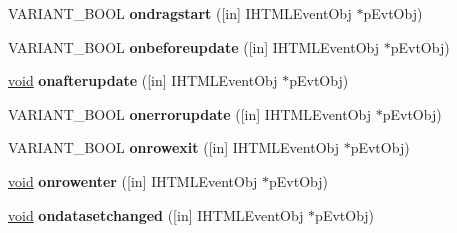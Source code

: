 \begin{DoxyCompactItemize}
V\+A\+R\+I\+A\+N\+T\+\_\+\+B\+O\+OL {\bfseries ondragstart} (\mbox{[}in\mbox{]} I\+H\+T\+M\+L\+Event\+Obj $\ast$p\+Evt\+Obj)
\item 
\mbox{\label{interface_m_s_h_t_m_l_1_1_h_t_m_l_form_element_events2_af6237e852617b7defe6d3bcddcc452fc}} 
V\+A\+R\+I\+A\+N\+T\+\_\+\+B\+O\+OL {\bfseries onbeforeupdate} (\mbox{[}in\mbox{]} I\+H\+T\+M\+L\+Event\+Obj $\ast$p\+Evt\+Obj)
\item 
\mbox{\label{interface_m_s_h_t_m_l_1_1_h_t_m_l_form_element_events2_a7a2217df95fcab8315219ac0586d25a4}} 
\hyperlink{interfacevoid}{void} {\bfseries onafterupdate} (\mbox{[}in\mbox{]} I\+H\+T\+M\+L\+Event\+Obj $\ast$p\+Evt\+Obj)
\item 
\mbox{\label{interface_m_s_h_t_m_l_1_1_h_t_m_l_form_element_events2_a716094f204afb6b6a631b0731f5d0967}} 
V\+A\+R\+I\+A\+N\+T\+\_\+\+B\+O\+OL {\bfseries onerrorupdate} (\mbox{[}in\mbox{]} I\+H\+T\+M\+L\+Event\+Obj $\ast$p\+Evt\+Obj)
\item 
\mbox{\label{interface_m_s_h_t_m_l_1_1_h_t_m_l_form_element_events2_aaf719770ec1838567d63c6818a734cef}} 
V\+A\+R\+I\+A\+N\+T\+\_\+\+B\+O\+OL {\bfseries onrowexit} (\mbox{[}in\mbox{]} I\+H\+T\+M\+L\+Event\+Obj $\ast$p\+Evt\+Obj)
\item 
\mbox{\label{interface_m_s_h_t_m_l_1_1_h_t_m_l_form_element_events2_ae28dc815498748758cf523e7dd248a53}} 
\hyperlink{interfacevoid}{void} {\bfseries onrowenter} (\mbox{[}in\mbox{]} I\+H\+T\+M\+L\+Event\+Obj $\ast$p\+Evt\+Obj)
\item 
\mbox{\label{interface_m_s_h_t_m_l_1_1_h_t_m_l_form_element_events2_ad898aa66f9d965352f519c7d92b1cd4f}} 
\hyperlink{interfacevoid}{void} {\bfseries ondatasetchanged} (\mbox{[}in\mbox{]} I\+H\+T\+M\+L\+Event\+Obj $\ast$p\+Evt\+Obj)
\item 
\mbox{\label{interface_m_s_h_t_m_l_1_1_h_t_m_l_form_element_events2_a1fc616d893386e8c2f5b3e85ce76e998}} 

\end{DoxyCompactItemize}
